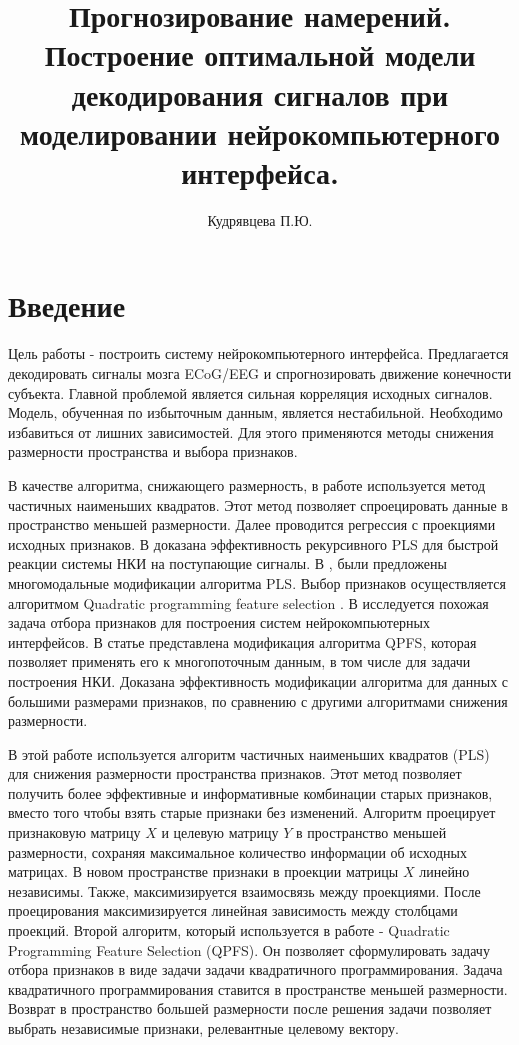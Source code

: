 \documentclass[12pt,twoside]{article}
\title
    [Построение оптимальной системы нейрокомпьютерного интерфейса]
    {Прогнозирование намерений. Построение оптимальной модели декодирования сигналов при моделировании нейрокомпьютерного интерфейса.}
\author {Кудрявцева П.Ю.} %
\begin{document}
\maketitle



\section{Введение}
 Цель работы - построить систему нейрокомпьютерного интерфейса. Предлагается декодировать сигналы мозга ECoG/EEG и спрогнозировать движение конечности субъекта. Главной проблемой  является сильная корреляция исходных сигналов. Модель, обученная по избыточным данным, является нестабильной. Необходимо избавиться от лишних зависимостей. Для этого применяются методы снижения размерности пространства и выбора признаков.
 
 В качестве алгоритма, снижающего размерность, в работе используется метод частичных наименьших квадратов. Этот метод позволяет спроецировать данные в пространство меньшей размерности. Далее проводится регрессия с проекциями исходных признаков\cite{pls_effective}\cite{pls_ni}. В \cite{elisey} доказана эффективность рекурсивного PLS для быстрой реакции системы НКИ на поступающие сигналы. В \cite{elisey2},\cite{elisey3} были предложены многомодальные модификации алгоритма PLS. Выбор признаков осуществляется алгоритмом Quadratic programming feature selection \cite{qpfc}. В  \cite{motrenko} исследуется похожая задача отбора признаков для построения систем нейрокомпьютерных интерфейсов. В статье представлена модификация алгоритма QPFS, которая позволяет применять его к многопоточным данным, в том числе для задачи построения НКИ. Доказана эффективность модификации алгоритма для данных с большими размерами признаков, по сравнению с другими алгоритмами снижения размерности.
 
 В этой работе используется алгоритм частичных наименьших квадратов (PLS) для снижения размерности пространства признаков. Этот метод позволяет получить более эффективные и информативные комбинации старых признаков, вместо того чтобы взять старые признаки без изменений. Алгоритм проецирует признаковую матрицу $X$ и целевую матрицу $Y$ в пространство меньшей размерности, сохраняя максимальное количество информации об исходных матрицах. В новом пространстве признаки в проекции матрицы $X$ линейно независимы. Также, максимизируется взаимосвязь между проекциями. После проецирования максимизируется линейная зависимость между столбцами проекций. Второй алгоритм, который используется в работе - Quadratic Programming Feature Selection (QPFS). Он позволяет сформулировать задачу отбора признаков в виде задачи задачи квадратичного программирования. Задача квадратичного программирования ставится в пространстве меньшей размерности. Возврат в пространство большей размерности после решения задачи позволяет выбрать независимые признаки, релевантные целевому вектору.

{}

\end{document}
